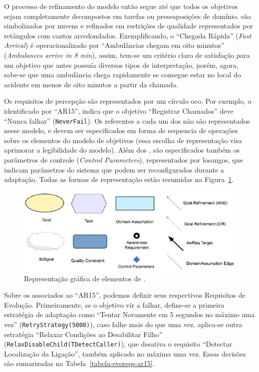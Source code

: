 O processo de refinamento do modelo então segue até que todos os objetivos sejam completamente decompostos em tarefas ou pressuposições de domínio. \sofgoals são simbolizados por nuvens e refinados em restrições de qualidade representados por retângulos com cantos arredondados. Exemplificando, o \sofgoal ``Chegada Rápida'' (\textit{Fast Arrival}) é operacionalizado por ``Ambulâncias chegam em oito minutos'' (\textit{Ambulances arrive in 8 min}), assim, tem-se um critério claro de satisfação para um objetivo que antes possuía diversos tipos de interpretação, porém, agora, sabe-se que uma ambulância chega rapidamente se consegue estar no local do acidente em menos de oito minutos a partir da chamada.

Os requisitos de percepção são representados por um círculo oco. Por exemplo, o \awreq identificado por ``AR15'', indica que o objetivo ``Registrar Chamados'' deve ``Nunca falhar'' (\texttt{NeverFail}). Os \evoreqs referentes a cada um dos \awreqs não são representados nesse modelo, e devem ser especificados em forma de sequencia de operações sobre os elementos do modelo de objetivos (essa escolha de representação visa aprimorar a legibilidade do modelo). Além dos \awreqs, são especificados também os parâmetros de controle (\textit{Control Parameters}), representados por losangos, que indicam parâmetros do sistema que podem ser reconfigurados durante a adaptação. Todas as formas de representação estão resumidas na Figura~\ref{figura-elementos-gore-eca}.

\begin{figure}
	\centering
	\includegraphics[width=1\textwidth]{figuras/modelos/Elementos-GORE.png}
	\caption{Representação gráfica de elementos de \gore.}
	\label{figura-elementos-gore-eca}
\end{figure}

Sobre os \evoreqs associados ao ``AR15'', podemos definir seus respectivos Requisitos de Evolução. Primeiramente, se o objetivo vir a falhar, define-se a primeira estratégia de adaptação como ``Tentar Novamente em 5 segundos no máximo uma vez'' (\texttt{RetryStrategy(5000)}), caso falhe mais do que uma vez, aplica-se outra estratégia ``Relaxar Condições ao Desabilitar Filho'' (\texttt{RelaxDisableChild(TDetectCaller)}), que desativa o requisito ``Detectar Localização da Ligação'', também aplicado no máximo uma vez. Essas decisões são sumarizadas na Tabela~\ref{tabela-evoreqs-ar15}.

